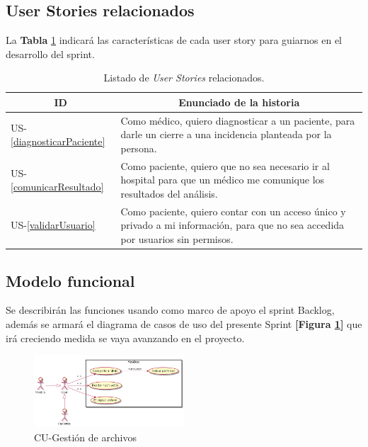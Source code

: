 \subsection{User Stories relacionados}
La \textbf{Tabla} \ref{US-Sprint8} indicará las características de cada user story para guiarnos en el desarrollo del sprint.

\newpage

\begin{table}[h]
    \centering
	\begin{tabular}{|l|p{9cm}|}
	\hline
        \multicolumn{1}{|c|}{\textbf{ID}} &
        \multicolumn{1}{|c|}{\textbf{Enunciado de la historia}} \\  
    \hline
        	US-\ref{diagnosticarPaciente} &
        	Como médico, quiero diagnosticar a un paciente, para darle un cierre a una incidencia planteada por la persona. \\ 
    \hline
        	US-\ref{comunicarResultado} &
        	Como paciente, quiero que no sea necesario ir al hospital para que un médico me comunique los resultados del análisis. \\       
    \hline
     	US-\ref{validarUsuario} &
     	Como paciente, quiero contar con un acceso único y privado a mi información, para que no sea accedida por usuarios sin permisos. \\
    \hline
    \end{tabular}
    \caption{Listado de \textit{User Stories} relacionados.}
    \label{US-Sprint8}
\end{table}

\subsection{Modelo funcional} 
Se describirán las funciones usando como marco de apoyo el sprint Backlog, además se armará el diagrama de casos de uso del presente Sprint \textbf{[Figura \ref{8-cu_compartición_encriptación}]} que irá creciendo  medida se vaya avanzando en el proyecto.

    \begin{figure}[h]
        \centering
        \includegraphics[width=0.5\textwidth]{img/dcu_sprint8}
        \caption{CU-Gestión de archivos}
		\label{8-cu_compartición_encriptación}
    \end{figure}


